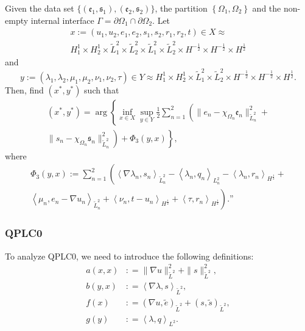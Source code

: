 \begin{problem}[QPLC3]
Given the data set $\{\!(\mathfrak{e}_1,\!\mathfrak{s}_1),\!(\mathfrak{e}_2,\!\mathfrak{s}_2)\!\}$, the partition $\left\{\Omega_1, \Omega_2 \right\}$ and the non-empty internal interface $\Gamma = \partial \Omega_1 \cap \partial \Omega_2$.
Let
\begin{multline}
x := 
(u_1, u_2, e_1, e_2, s_1, s_2, r_1, r_2, t)
\in X \approx \\
H^1_1 \times
H^1_2 \times
\tilde{L}^2_1 \times
\tilde{L}^2_2 \times
\tilde{L}^2_1 \times
\tilde{L}^2_2 \times
H^{-\frac12} \times
H^{-\frac12} \times
H^\frac12
\end{multline}
and
\begin{equation}
y :=
(\lambda_1, \lambda_2, \mu_1, \mu_2, \nu_1, \nu_2, \tau)
\in Y \approx
H^1_1 \times
H^1_2 \times
\tilde{L}^2_1 \times
\tilde{L}^2_2 \times
H^{-\frac12} \times
H^{-\frac12} \times
H^\frac12.
\end{equation}
Then, find $(x^*, y^*)$ such that
\begin{multline}
(x^*, y^*) =
\arg
\left\{
\inf_{x \in X}
\sup_{y \in Y}
\frac12 \sum_{n=1}^{2}
\left(
\|e_n -\chi_{\Omega_n}\mathfrak{e}_n\|^2_{\tilde{L}^2_n}+
\right.
\right.
\\
\left.
\left.
\|s_n -\chi_{\Omega_n}\mathfrak{s}_n\|^2_{\tilde{L}^2_n}
\right)+
\Phi_3(y,x)
\right\},
\end{multline}
where
\begin{multline}
    \Phi_3(y,x) :=
    \sum_{n=1}^{2}
    \left(
    \left\langle \nabla \lambda_n, s_n \right\rangle_{\tilde{L}^2_n}-
    \left\langle \lambda_n, q_n \right\rangle_{L^2_n}-
    \left \langle \lambda_n, r_n \right \rangle_{H^\frac12}
    \right.
    +\\
    \left.
    \left\langle \mu_n, e_n - \nabla u_n \right\rangle_{\tilde{L}^2_n}+
    \left\langle \nu_n, t-u_n\right\rangle_{H^\frac12}+
    \left \langle \tau, r_n \right \rangle_{H^\frac12}    
    \right).\textrm{''}
\end{multline}
\end{problem}

\subsubsection{QPLC0}
To analyze QPLC0, we need to introduce the following definitions:
\begin{align}
    a(x,x) &: = \|\nabla u\|^2_{\tilde{L}^2} + \|s\|^2_{\tilde{L}^2}, \\
    b(y,x) &: = \left\langle \nabla \lambda, s\right\rangle_{\tilde{L}^2}, \\
    f(x)   &: = \left( \nabla u , \tilde{e} \right)_{\tilde{L}^2} + \left( s , \tilde{s} \right)_{\tilde{L}^2} , \\
    g(y)   &: = \left\langle \lambda , q \right\rangle_{L^2}.
\end{align}

